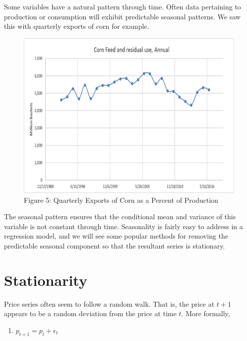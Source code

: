 \documentclass[
  letterpaper,
  DIV=11,
  numbers=noendperiod]{scrreprt}
\providecommand{\tightlist}{%
  \setlength{\itemsep}{0pt}\setlength{\parskip}{0pt}}\usepackage{longtable,booktabs,array}
\begin{document}
Some variables have a natural pattern through time. Often data
pertaining to production or consumption will exhibit predictable
seasonal patterns. We saw this with quarterly exports of corn for
example.

\begin{figure}

{\centering \includegraphics{Excel-files/IntroductiontoCommodityTS-FeedGrains_Corn_files/image026.png}

}

\caption{Figure 5: Quarterly Exports of Corn as a Percent of Production}

\end{figure}

The seasonal pattern ensures that the conditional mean and variance of
this variable is not constant through time. Seasonality is fairly easy
to address in a regression model, and we will see some popular methods
for removing the predictable seasonal component so that the resultant
series is stationary.

\hypertarget{stationarity}{%
\section{Stationarity}\label{stationarity}}

Price series often seem to follow a random walk. That is, the price at
\(t+1\) appears to be a random deviation from the price at time \(t\).
More formally,

\begin{enumerate}
\def\labelenumi{(\arabic{enumi})}
\setcounter{enumi}{2}
\tightlist
\item
  \(p_{t+1} = p_{t} + \epsilon_t\)
\end{enumerate}
\end{document}

